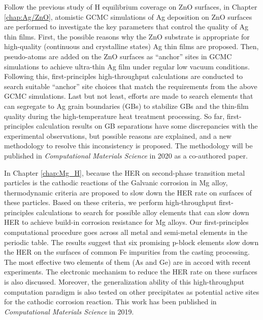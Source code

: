 Follow the previous study of H equilibrium coverage on ZnO surfaces, in Chapter \ref{chap:Ag/ZnO}, atomistic \acf{GCMC} simulations of Ag deposition on ZnO surfaces are performed to investigate the key parameters that control the quality of Ag thin films. First, the possible reasons why the ZnO substrate is appropriate for high-quality (continuous and crystalline states) Ag thin films are proposed. Then, pseudo-atoms are added on the ZnO surfaces as ``anchor'' sites in GCMC simulations to achieve ultra-thin Ag film under regular low vacuum conditions. Following this, first-principles high-throughput calculations are conducted to search suitable ``anchor'' site choices that match the requirements from the above GCMC simulations. Last but not least, efforts are made to search elements that can segregate to Ag grain boundaries (GBs) to stabilize GBs and the thin-film quality during the high-temperature heat treatment processing. So far, first-principles calculation results on GB separations have some discrepancies with the experimental observations, but possible reasons are explained, and a new methodology to resolve this inconsistency is proposed. The methodology will be published in \textit{Computational Materials Science} in 2020 as a co-authored paper. \cite{yang2020grain}

In Chapter \ref{chap:Mg_H}, because the \acf{HER} on second-phase transition metal particles is the cathodic reactions of the Galvanic corrosion in Mg alloy, thermodynamic criteria are proposed to slow down the HER rate on surfaces of these particles. Based on these criteria, we perform high-throughput first-principles calculations to search for possible alloy elements that can slow down HER to achieve build-in corrosion resistance for Mg alloys.  Our first-principles computational procedure goes across all metal and semi-metal elements in the periodic table. The results suggest that six promising p-block elements slow down the HER on the surfaces of common Fe impurities from the casting processing. The most effective two elements of them (As and Ge) are in accord with recent experiments. The electronic mechanism to reduce the HER rate on these surfaces is also discussed. Moreover, the generalization ability of this high-throughput computation paradigm is also tested on other precipitates as potential active sites for the cathodic corrosion reaction. This work has been published in \textit{Computational Materials Science} in 2019. \cite{zhang2019first}


